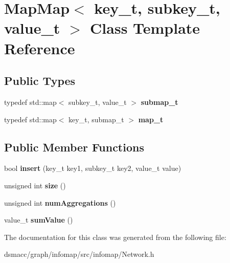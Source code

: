 \hypertarget{classMapMap}{}\section{Map\+Map$<$ key\+\_\+t, subkey\+\_\+t, value\+\_\+t $>$ Class Template Reference}
\label{classMapMap}
\subsection*{Public Types}
\begin{DoxyCompactItemize}
\item 
\mbox{\label{classMapMap_a016265258a773d85597f1b3a7f5993be}} 
typedef std\+::map$<$ subkey\+\_\+t, value\+\_\+t $>$ {\bfseries submap\+\_\+t}
\item 
\mbox{\label{classMapMap_a75fc612da64451cd71d5f209408672f4}} 
typedef std\+::map$<$ key\+\_\+t, submap\+\_\+t $>$ {\bfseries map\+\_\+t}
\end{DoxyCompactItemize}
\subsection*{Public Member Functions}
\begin{DoxyCompactItemize}
\item 
\mbox{\label{classMapMap_a0f11e080088cec22300a8ec0f3f90a82}} 
bool {\bfseries insert} (key\+\_\+t key1, subkey\+\_\+t key2, value\+\_\+t value)
\item 
\mbox{\label{classMapMap_a038309ca01a8fc2c8e48996fba560a9a}} 
unsigned int {\bfseries size} ()
\item 
\mbox{\label{classMapMap_aefbe05c30b420d559284ab6e2370b026}} 
unsigned int {\bfseries num\+Aggregations} ()
\item 
\mbox{\label{classMapMap_aa2d0298050db2613079d8e018b7c9da4}} 
value\+\_\+t {\bfseries sum\+Value} ()
\end{DoxyCompactItemize}


The documentation for this class was generated from the following file\+:\begin{DoxyCompactItemize}
\item 
dsmacc/graph/infomap/src/infomap/Network.\+h\end{DoxyCompactItemize}
